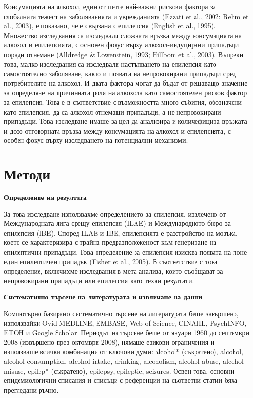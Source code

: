 \documentclass{article}
\begin{document}
Консумацията на алкохол, един от петте най-важни рискови фактора за глобалната тежест на заболяванията и уврежданията (Ezzati et al., 2002; Rehm et al., 2003), е показано, че е свързана с епилепсия (English et al., 1995). Множество изследвания са изследвали сложната връзка между консумацията на алкохол и епилепсията, с основен фокус върху алкохол-индуцирани припадъци поради отнемане (Alldredge \& Lowenstein, 1993; Hillbom et al., 2003). Въпреки това, малко изследвания са изследвали настъпването на епилепсия като самостоятелно заболяване, както и появата на непровокирани припадъци сред потребителите на алкохол. И двата фактора могат да бъдат от решаващо значение за определяне на причинната роля на алкохола като самостоятелен рисков фактор за епилепсия. Това е в съответствие с възможността много събития, обозначени като епилепсия, да са алкохол-отнемащи припадъци, а не непровокирани припадъци. Това изследване имаше за цел да анализира и количефицира връзката и дозо-отговорната връзка между консумацията на алкохол и епилепсията, с особен фокус върху изследването на потенциални механизми.

\section*{Методи}
\textbf{Определение на резултата}

За това изследване използвахме определението за епилепсия, извлечено от Международната лига срещу епилепсия (ILAE) и Международното бюро за епилепсия (IBE). Според ILAE и IBE, епилепсията е разстройство на мозъка, което се характеризира с трайна предразположеност към генериране на епилептични припадъци. Това определение за епилепсия изисква появата на поне един епилептичен припадък (Fisher et al., 2005). В съответствие с това определение, включихме изследвания в мета-анализа, които съобщават за непровокирани припадъци или епилепсия като техни резултати.

\textbf{Систематично търсене на литературата и извличане на данни}

Компютърно базирано систематично търсене на литературата беше завършено, използвайки Ovid MEDLINE, EMBASE, Web of Science, CINAHL, PsychINFO, ETOH и Google Scholar. Периодът на търсене беше от януари 1960 до септември 2008 (извършено през октомври 2008), нямаше езикови ограничения и използваше всички комбинации от ключови думи: alcohol* (съкратено), alcohol, alcohol consumption, alcohol intake, drinking, alcoholism, alcohol abuse, alcohol misuse, epilep* (съкратено), epilepsy, epileptic, seizures. Освен това, основни епидемиологични списания и списъци с референции на съответни статии бяха прегледани ръчно.
\end{document}
